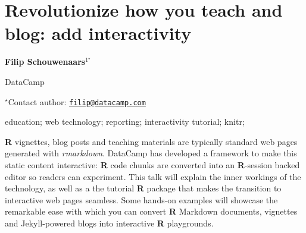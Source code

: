 \documentclass[\main/boa.tex]{subfiles}
\begin{document}
\section{Revolutionize how you teach and blog: add interactivity}

\begin{center}
  {\bf {} Filip Schouwenaars$^{1^\star}$}
\end{center}

\vskip 0.3cm

\begin{affiliations}
\begin{enumerate}
\begin{minipage}{0.915\textwidth}
\centering
\item DataCamp \\[-2pt]
\end{minipage}
\end{enumerate}
$^\star$Contact author: \href{mailto:filip@datacamp.com}{\nolinkurl{filip@datacamp.com}}\\
\end{affiliations}

\vskip 0.5cm

\begin{minipage}{0.915\textwidth}
\keywords education; web technology; reporting; interactivity
\packages {} tutorial;  knitr; 
\end{minipage}

\vskip 0.8cm

\textbf{R} vignettes, blog posts and teaching materials are typically
standard web pages generated with \emph{rmarkdown}. DataCamp has
developed a framework to make this static content interactive:
\textbf{R} code chunks are converted into an \textbf{R}-session backed
editor so readers can experiment. This talk will explain the inner
workings of the technology, as well as a the tutorial \textbf{R} package
that makes the transition to interactive web pages seamless. Some
hands-on examples will showcase the remarkable ease with which you can
convert \textbf{R} Markdown documents, vignettes and Jekyll-powered
blogs into interactive \textbf{R} playgrounds.
\end{document}
